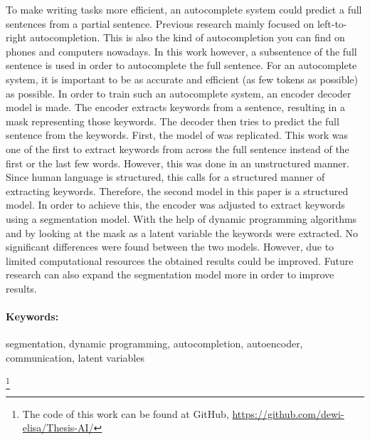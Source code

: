 To make writing tasks more efficient, an autocomplete system could predict a full sentences from a partial sentence.
Previous research mainly focused on left-to-right autocompletion. 
This is also the kind of autocompletion you can find on phones and computers nowadays.
In this work however, a subsentence of the full sentence is used in order to autocomplete the full sentence.
For an autocomplete system, it is important to be as accurate and efficient (as few tokens as possible) as possible. 
In order to train such an autocomplete system, an encoder decoder model is made. 
The encoder extracts keywords from a sentence, resulting in a mask representing those keywords.
The decoder then tries to predict the full sentence from the keywords.
First, the model of  was replicated. 
This work was one of the first to extract keywords from across the full sentence instead of the first or the last few words. 
However, this was done in an unstructured manner. 
Since human language is structured, this calls for a structured manner of extracting keywords. 
Therefore, the second model in this paper is a structured model. 
In order to achieve this, the encoder was adjusted to extract keywords using a segmentation model. 
With the help of dynamic programming algorithms and by looking at the mask as a latent variable the keywords were extracted.
No significant differences were found between the two models. 
However, due to limited computational resources the obtained results could be improved. 
Future research can also expand the segmentation model more in order to improve results.

\paragraph{Keywords:} segmentation, dynamic programming, autocompletion, autoencoder, communication, latent variables

{\let\thefootnote\relax\footnote{{The code of this work can be found at GitHub, \url{https://github.com/dewi-elisa/Thesis-AI/}}}}